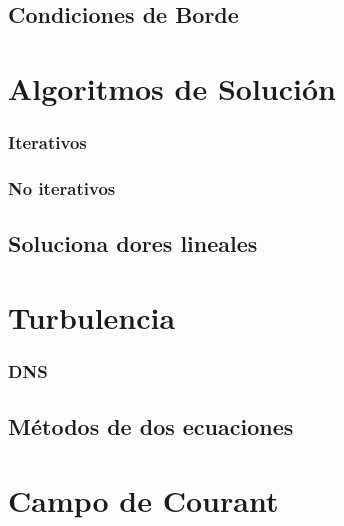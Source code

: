 	\subsection{Condiciones de Borde}
\section{Algoritmos de Solución} %
	\subsubsection{Iterativos}
	\subsubsection{No iterativos}
	\subsection{Soluciona dores lineales}

\section{Turbulencia}
	\subsubsection{DNS}
	\subsection{Métodos de dos ecuaciones} %
	
\section{Campo de Courant}

	

